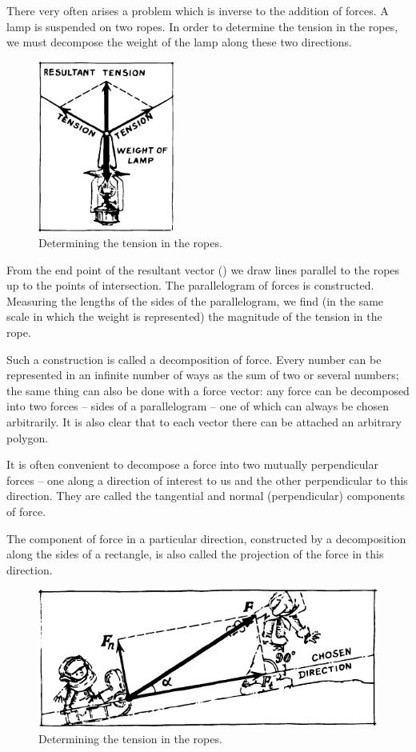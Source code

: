 There very often arises a problem which is inverse to the addition of
forces. A lamp is suspended on two ropes.  In order to determine the
tension in the ropes, we must decompose the weight of the lamp along
these two directions.  
\begin{figure}[!ht]
\centering
\includegraphics[width=0.4\textwidth]{figures/fig-01-08.pdf}
\caption{Determining the tension in the ropes.}
\label{fig-1.8}
\end{figure}

From the end point of the resultant vector
() we draw lines parallel to the ropes up to the points of
intersection. The parallelogram of forces is constructed.  Measuring
the lengths of the sides of the parallelogram, we find (in the same
scale in which the weight is represented) the magnitude of the
tension in the rope.  

Such a construction is called a decomposition of force. Every number can be represented in an infinite number of ways as the
sum of two or several numbers; the same thing can also be done with a
force vector: any force can be decomposed into two forces -- sides of
a parallelogram -- one of which can always be chosen arbitrarily. It
is also clear that to each vector there can be attached an arbitrary
polygon.

It is often convenient to decompose a force into two mutually
perpendicular forces -- one along a direction of interest to us and the other perpendicular to this direction. They are called the tangential and normal (perpendicular) components of force.  

The component of force in a particular direction, constructed by a
decomposition along the sides of a rectangle, is also called the
projection of the force in this direction.  
\begin{figure}
\centering
\includegraphics[width=\textwidth]{figures/fig-01-09.pdf}
\caption{Determining the tension in the ropes.}
\label{fig-1.9}
\end{figure}

